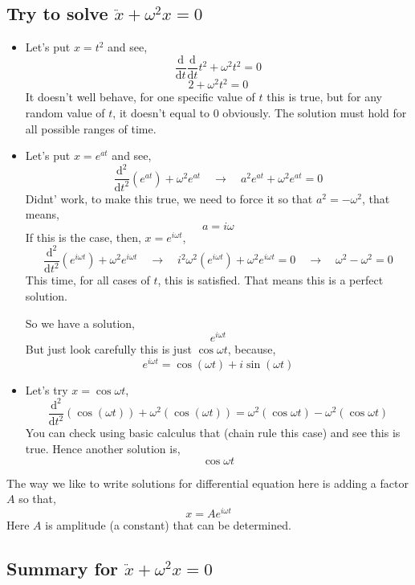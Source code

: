 \documentclass[11pt, a4paper]{memoir}
\begin{document}
\subsection{ Try to solve $ \ddot{x} + \omega^2 x = 0$}
\begin{itemize}
    \item Let's put $x = t^2$ and see,
\[ 
\frac{\mathrm{d} }{\mathrm{d}t } \frac{\mathrm{d} }{\mathrm{d} t} t^2 + \omega^2 t^2 = 0
\]
\[ 
2 + \omega^2 t^2 = 0
\]
It doesn't well behave, for one specific value of $t$ this is true, but for any random value of $t$, it doesn't equal to $0$ obviously.
The solution must hold for all possible ranges of time.
\item Let's put $x = e^{at}$ and see,
\[ 
    \frac{\mathrm{d} ^2}{\mathrm{d} t^2}\left( e^{a t} \right) + \omega^2 e^{a t} \quad
    \to \quad 
    a^2 e^{a t} + \omega^2 e^{at} =0
\]
Didnt' work, to make this true, we need to force it so that $a^2 = - \omega^2$, that means,
\[ 
a = i \omega
\]
If this is the case, then, $x = e^{i \omega t}$,
\[ 
    \frac{\mathrm{d} ^2}{\mathrm{d} t^2} \left( e^{ i \omega t} \right) + \omega^2 e^{i \omega t} \quad \to \quad i^2 \omega^2 \left( e^{i \omega t} \right) + \omega^2 e^{i \omega t} = 0 \quad 
    \to 
    \quad \omega^2 - \omega^2 = 0
\] This time, for all cases of $t$, this is satisfied. That means this is a perfect solution. 

So we have a solution, 
\[\boxed{  
    e^{ i \omega t}} 
\]
But just look carefully this is just $\cos \omega t$, because,
\[ 
    e^{i \omega t} = \cos \left( \omega t \right) + i \sin \left( \omega t \right) 
\]
\item Let's try $x = \cos \omega t$, 
    \[ 
        \frac{\mathrm{d} ^2}{\mathrm{d} t^2 }\left( \cos \left( \omega t \right)  \right) + \omega^2 \left( \cos \left( \omega t \right)  \right) = \omega^2 \left( \cos \omega t \right) - \omega^2 \left( \cos \omega t \right)  
    \]
    You can check using basic calculus that (chain rule this case) and see this is true. Hence another solution is, 
    \[ 
    \boxed{ \cos \omega t}
    \]
\end{itemize}

The way we like to write solutions for differential equation here is adding a factor $A$ so that,
\[ 
x = A e^{i \omega t}
\]
Here $A$ is amplitude (a constant) that can be determined. 

\subsection{ Summary for $ \ddot{x} + \omega^2 x = 0$}
\end{document}
